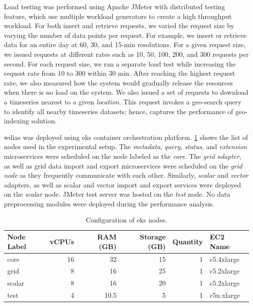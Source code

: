 \documentclass[conference]{IEEEtran}
\begin{document}
Load testing was performed using Apache JMeter with distributed testing feature, which use multiple workload generators to create a high throughput workload. For both insert and retrieve requests, we varied the request size by varying the number of data points per request. For example, we insert or retrieve data for an entire day at 60, 30, and 15-min resolutions. For a given request size, we issued requests at different rates such as 10, 50, 100, 200, and 300 requests per second. For each request size, we ran a separate load test while increasing the request rate from 10 to 300 within 30 min. After reaching the highest request rate, we also measured how the system would gradually release the resources when there is no load on the system. We also issued a set of requests to download a timeseries nearest to a given \emph{location}. This request invokes a geo-search query to identify all nearby timeseries datasets; hence, captures the performance of geo-indexing solution.

\acrshort{wdias} was deployed using \acrfull{eks} container orchestration platform. \cref{ptab:aws_eks_nodes} shows the list of nodes used in the experimental setup. The \emph{metadata}, \emph{query}, \emph{status}, and \emph{extension} microservices were scheduled on the node labeled as the \emph{core}. The \emph{grid adapter}, as well as grid data import and export microservices were scheduled on the \emph{grid node} as they frequently communicate with each other. Similarly, \emph{scalar} and \emph{vector} adapters, as well as scalar and vector import and export services were deployed on the \emph{scalar} node. JMeter test server was hosted on the \emph{test} node. No data preprocessing modules were deployed during the performance analysis.


\begin{table}[tb!]
\caption{Configuration of \acrshort{eks} nodes.}
\begin{center}
\begin{adjustbox}{width=0.45\textwidth}
\begin{tabular}{|l|r|r|r|r|l|}
\hline
\textbf{Node Label} & \textbf{vCPUs} & \textbf{RAM (GB)} & \textbf{Storage (GB)} & \textbf{Quantity} & \textbf{EC2 Name} \\ \hline
core & 16 & 32 & 15 & 1 & c5.4xlarge \\ \hline
grid & 8 & 16 & 25 & 1 & c5.2xlarge \\ \hline
scalar & 8 & 16 & 20 & 1 & c5.2xlarge \\ \hline
test & 4 & 10.5 & 5 & 1 & c5n.xlarge \\ \hline
\end{tabular}
\end{adjustbox}
\label{ptab:aws_eks_nodes}
\end{center}
\end{table}
\end{document}

